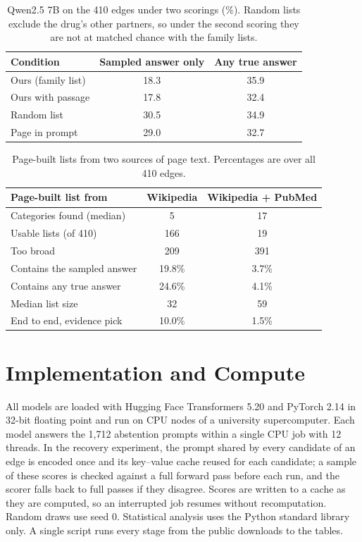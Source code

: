\documentclass[letterpaper]{article} %
\begin{document}
\begin{table}[h]
\centering
\small
\setlength{\tabcolsep}{3pt}
\begin{tabular}{lcc}
\toprule
Condition & Sampled answer only & Any true answer \\
\midrule
Ours (family list) & 18.3 & 35.9 \\
Ours with passage & 17.8 & 32.4 \\
Random list & 30.5 & 34.9 \\
Page in prompt & 29.0 & 32.7 \\
\bottomrule
\end{tabular}
\caption{Qwen2.5 7B on the 410 edges under two scorings (\%). Random lists
exclude the drug's other partners, so under the second scoring they are not
at matched chance with the family lists.}
\label{tab:scoring}
\end{table}

\begin{table}[h]
\centering
\small
\setlength{\tabcolsep}{3pt}
\begin{tabular}{lcc}
\toprule
Page-built list from & Wikipedia & Wikipedia + PubMed \\
\midrule
Categories found (median) & 5 & 17 \\
Usable lists (of 410) & 166 & 19 \\
Too broad & 209 & 391 \\
Contains the sampled answer & 19.8\% & 3.7\% \\
Contains any true answer & 24.6\% & 4.1\% \\
Median list size & 32 & 59 \\
End to end, evidence pick & 10.0\% & 1.5\% \\
\bottomrule
\end{tabular}
\caption{Page-built lists from two sources of page text. Percentages are over
all 410 edges.}
\label{tab:pagebuilt}
\end{table}

\section{Implementation and Compute}

All models are loaded with Hugging Face Transformers 5.20 and PyTorch 2.14 in
32-bit floating point and run on CPU nodes of a university supercomputer. Each
model answers the 1,712 abstention prompts within a single CPU job with 12
threads. In the recovery experiment, the prompt shared by every candidate of an
edge is encoded once and its key--value cache reused for each candidate; a
sample of these scores is checked against a full forward pass before each run,
and the scorer falls back to full passes if they disagree. Scores are written
to a cache as they are computed, so an interrupted job resumes without
recomputation. Random draws use seed 0. Statistical analysis uses the Python
standard library only. A single script runs every stage from the public
downloads to the tables.
\end{document}
